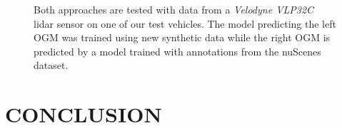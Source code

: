 \documentclass[conference]{IEEEtran}
\begin{document}
\begin{figure}[h]
\centering
{}
\caption{Both approaches are tested with data from a \textit{Velodyne VLP32C} lidar sensor on one of our test vehicles. The model predicting the left OGM was trained using new synthetic data while the right OGM is predicted by a model trained with annotations from the nuScenes dataset.}
\label{fig:predictions-vlp32}
\end{figure}


\section{CONCLUSION}
\end{document}

